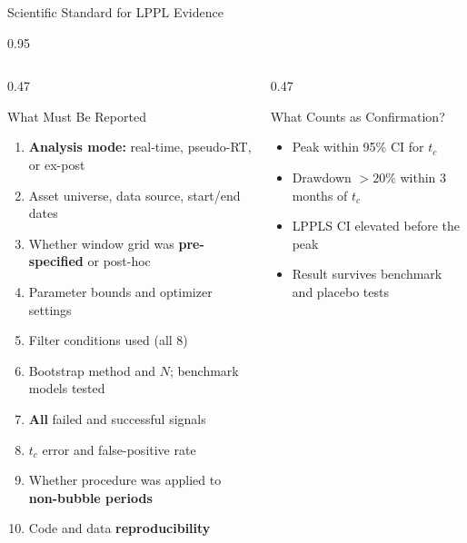 \documentclass[9pt, aspectratio=169, t]{beamer}
\begin{document}
\begin{frame}{Scientific Standard for LPPL Evidence}
    \begin{cminipage}{0.95\textwidth}
    {\scriptsize
    \begin{columns}[T]
        \begin{column}{0.47\textwidth}
            \begin{alertblock}{What Must Be Reported}
                \begin{enumerate}\setlength{\itemsep}{0pt}
                    \item \textbf{Analysis mode:} real-time, pseudo-RT, or ex-post
                    \item Asset universe, data source, start/end dates
                    \item Whether window grid was \textbf{pre-specified} or post-hoc
                    \item Parameter bounds and optimizer settings
                    \item Filter conditions used (all 8)
                    \item Bootstrap method and $N$; benchmark models tested
                    \item \textbf{All} failed and successful signals
                    \item $t_c$ error and false-positive rate
                    \item Whether procedure was applied to \textbf{non-bubble periods}
                    \item Code and data \textbf{reproducibility}
                \end{enumerate}
            \end{alertblock}
        \end{column}
        \begin{column}{0.47\textwidth}
            \begin{block}{What Counts as Confirmation?}
                \begin{itemize}\setlength{\itemsep}{0pt}
                    \item Peak within 95\% CI for $t_c$
                    \item Drawdown $> 20\%$ within 3 months of $t_c$
                    \item LPPLS CI elevated before the peak
                    \item Result survives benchmark and placebo tests
                \end{itemize}

\end{block}
\end{column}
\end{columns}}
\end{cminipage}
\end{frame}
\end{document}
